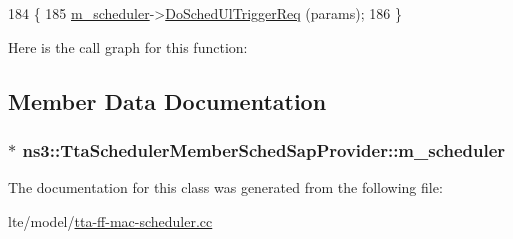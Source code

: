 \begin{DoxyCode}
184 \{
185   \hyperlink{classns3_1_1TtaSchedulerMemberSchedSapProvider_adae73622ccf98020c764ffd94fb4a47d}{m\_scheduler}->\hyperlink{classns3_1_1TtaFfMacScheduler_ab4894f9f6d69451c8b8c7c2af93400b5}{DoSchedUlTriggerReq} (params);
186 \}
\end{DoxyCode}


Here is the call graph for this function\+:




\subsection{Member Data Documentation}
\subsubsection[{\texorpdfstring{m\+\_\+scheduler}{m_scheduler}}]{ $\ast$ ns3\+::\+Tta\+Scheduler\+Member\+Sched\+Sap\+Provider\+::m\+\_\+scheduler\hspace{0.3cm}{\ttfamily [private]}}\hypertarget{classns3_1_1TtaSchedulerMemberSchedSapProvider_adae73622ccf98020c764ffd94fb4a47d}{}\label{classns3_1_1TtaSchedulerMemberSchedSapProvider_adae73622ccf98020c764ffd94fb4a47d}


The documentation for this class was generated from the following file\+:\begin{DoxyCompactItemize}
\item 
lte/model/\hyperlink{lte_2model_2tta-ff-mac-scheduler_8cc}{tta-\/ff-\/mac-\/scheduler.\+cc}\end{DoxyCompactItemize}
